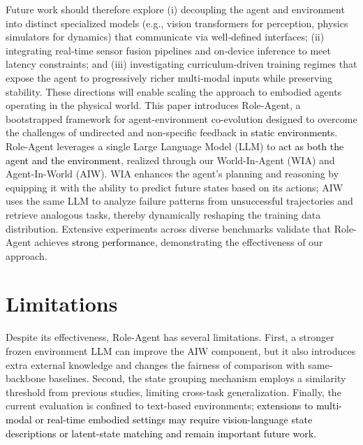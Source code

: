 \documentclass[11pt]{article}
\begin{document}
Future work should therefore explore (i) decoupling the agent and environment into distinct specialized models (e.g., vision transformers for perception, physics simulators for dynamics) that communicate via well‑defined interfaces; (ii) integrating real‑time sensor fusion pipelines and on‑device inference to meet latency constraints; and (iii) investigating curriculum‑driven training regimes that expose the agent to progressively richer multi‑modal inputs while preserving stability. These directions will enable scaling the approach to embodied agents operating in the physical world.
This paper introduces Role-Agent, a bootstrapped framework for agent-environment co-evolution designed to overcome the challenges of undirected and non-specific feedback in \textcolor{black}{static environments}. Role-Agent leverages a single Large Language Model (LLM) to \textcolor{black}{act as both the agent and the environment}, realized through our World-In-Agent (WIA) and Agent-In-World (AIW). WIA enhances the agent's planning and reasoning by equipping it with the ability to predict future states based on its actions; AIW uses the same LLM to analyze failure patterns from unsuccessful trajectories and retrieve analogous tasks, thereby dynamically reshaping the training data distribution. Extensive experiments across diverse benchmarks validate that Role-Agent achieves \textcolor{black}{strong performance}, demonstrating the effectiveness of our approach.


\section*{Limitations}
Despite its effectiveness, Role-Agent has several limitations. First, a stronger frozen environment LLM can improve the AIW component, but it also introduces extra external knowledge and changes the fairness of comparison with same-backbone baselines. Second, the state grouping mechanism employs a similarity threshold from previous studies, limiting cross-task generalization.  Finally, the current evaluation is confined to text-based environments; \textcolor{black}{extensions to multi-modal or real-time embodied settings may require vision-language state descriptions or latent-state matching and remain important future work.}
 



%


\end{document}
